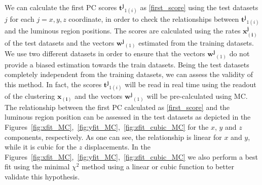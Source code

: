  We can calculate the first PC scores $\mathbf{t^j}_{1(i)}$ as \eqref{first_score} using the test datasets $j$ for each $j=x,y,z$ coordinate, in order to check the relationships between $\mathbf{t^{j}}_{1(i)}$ and the luminous region positions. The scores are calculated using the rates $\mathbf{x^{j}_{(i)}}$ of the test datasets and the vectors $\mathbf{w^{j}}_{(1)}$ estimated from the training datasets. We use two different datasets in order to ensure that the vectors $\mathbf{w^{j}}_{(1)}$ do not provide a biased estimation towards the train datasets. Being the test datasets completely independent from the training datasets, we can assess the validity of this method. In fact, the scores $\mathbf{t^{j}}_{1(i)}$ will be read in real time using the readout of the clustering $\mathbf{x_{(i)}}$ and the vectors $\mathbf{w^{j}}_{(1)}$ will be pre-calculated using MC. The relationship between the first PC calculated as \eqref{first_score} and the luminous region position can be assessed in the test datasets as depicted in the Figures~\ref{fig:xfit_MC},~\ref{fig:yfit_MC},~\ref{fig:zfit_cubic_MC} for the $x$, $y$ and $z$ components, respectively. As one can see, the relationship is linear for $x$ and $y$, while it is cubic for the $z$ displacements. In the Figures~\ref{fig:xfit_MC},~\ref{fig:yfit_MC},~\ref{fig:zfit_cubic_MC} we also perform a best fit using the minimal $\chi^2$ method using a linear or cubic function to better validate this hypothesis. 


